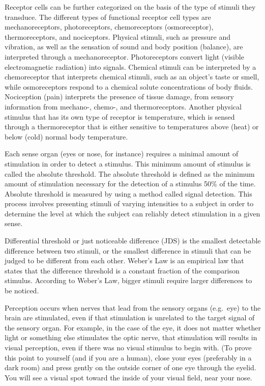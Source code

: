 Receptor cells can be further categorized on the basis of the type of
stimuli they transduce. The different types of functional receptor cell
types are mechanoreceptors, photoreceptors, chemoreceptors
(osmoreceptor), thermoreceptors, and nociceptors. Physical stimuli, such
as pressure and vibration, as well as the sensation of sound and body
position (balance), are interpreted through a mechanoreceptor.
Photoreceptors convert light (visible electromagnetic radiation) into
signals. Chemical stimuli can be interpreted by a chemoreceptor that
interprets chemical stimuli, such as an object's taste or smell, while
osmoreceptors respond to a chemical solute concentrations of body
fluids. Nociception (pain) interprets the presence of tissue damage,
from sensory information from mechano-, chemo-, and thermoreceptors.
Another physical stimulus that has its own type of receptor is
temperature, which is sensed through a thermoreceptor that is either
sensitive to temperatures above (heat) or below (cold) normal body
temperature.

Each sense organ (eyes or nose, for instance) requires a minimal amount
of stimulation in order to detect a stimulus. This minimum amount of
stimulus is called the absolute threshold. The absolute threshold is
defined as the minimum amount of stimulation necessary for the detection
of a stimulus 50\% of the time. Absolute threshold is measured by using
a method called signal detection. This process involves presenting
stimuli of varying intensities to a subject in order to determine the
level at which the subject can reliably detect stimulation in a given
sense.

Differential threshold or just noticeable difference (JDS) is the
smallest detectable difference between two stimuli, or the smallest
difference in stimuli that can be judged to be different from each
other. Weber's Law is an empirical law that states that the difference
threshold is a constant fraction of the comparison stimulus. According
to Weber's Law, bigger stimuli require larger differences to be noticed.

Perception occurs when nerves that lead from the sensory organs
(e.g.~eye) to the brain are stimulated, even if that stimulation is
unrelated to the target signal of the sensory organ. For example, in the
case of the eye, it does not matter whether light or something else
stimulates the optic nerve, that stimulation will results in visual
perception, even if there was no visual stimulus to begin with. (To
prove this point to yourself (and if you are a human), close your eyes
(preferably in a dark room) and press gently on the outside corner of
one eye through the eyelid. You will see a visual spot toward the inside
of your visual field, near your nose.

